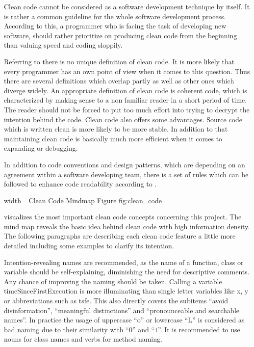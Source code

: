 Clean code cannot be considered as a software development technique by itself. It is rather a common guideline for the whole 
software development process. According to this, a programmer who is facing the task of developing new software, should rather prioritize on 
producing clean code from the beginning than valuing speed and coding sloppily.

Referring to \cite{CLEANCODE} there is no unique definition of clean code. It is more likely that every programmer has an own point of 
view when it comes to this question. Thus there are several definitions which overlap partly as well as other ones which diverge widely. 
An appropriate definition of clean code is coherent code, which is characterized by making sense to a non familiar reader in a short period 
of time. The reader should not be forced to put too much effort into trying to decrypt the intention behind the code. Clean code also offers 
some advantages. Source code which is written clean is more likely to be more stable. In addition to that maintaining clean code is basically 
much more efficient when it comes to expanding or debugging.

In addition to code conventions and design patterns, which are depending on an agreement within a software developing team, there is a set of rules
which can be followed to enhance code readability according to \citeauthor{CLEANCODE}.

 {width=\textwidth}%
 {Clean Code Mindmap}%
 {Figure}%
 {fig:clean_code}%

 visualizes the most important clean code concepts concerning this project. The mind map reveals the basic 
idea behind clean code with high information density. The following paragraphs are describing each clean code feature a little more detailed
including some examples to clarify its intention.

Intention-revealing names are recommended, as the name of a function, class or variable should 
be self-explaining, diminishing the need for descriptive comments. Any chance of improving the naming should be taken. Calling a variable 
timeSinceFirstExecution is more illuminating than single letter variables like x, y or abbreviations such as tsfe. This also directly 
covers the subitems ``avoid disinformation'', ``meaningful distinctions'' and ``pronounceable and searchable names''. In practice the 
usage of uppercase ``o'' or lowercase ``L'' is considered as bad naming due to their similarity with ``$0$'' and ``$1$''.
It is recommended to use nouns for class names and verbs for method naming.

